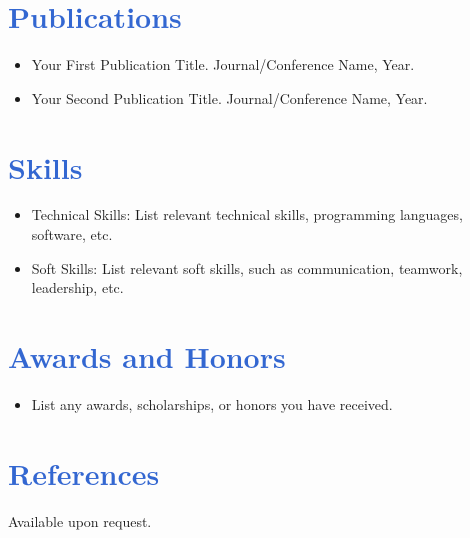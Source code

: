 \documentclass[11pt,a4paper]{article}
\begin{document}
\section*{\textcolor{highlight}{Publications}}
\begin{itemize}
    \item Your First Publication Title. Journal/Conference Name, Year.
    \item Your Second Publication Title. Journal/Conference Name, Year.
\end{itemize}

\section*{\textcolor{highlight}{Skills}}
\begin{itemize}
    \item Technical Skills: List relevant technical skills, programming languages, software, etc.
    \item Soft Skills: List relevant soft skills, such as communication, teamwork, leadership, etc.
\end{itemize}

\section*{\textcolor{highlight}{Awards and Honors}}
\begin{itemize}
    \item List any awards, scholarships, or honors you have received.
\end{itemize}

\section*{\textcolor{highlight}{References}}
Available upon request.
\end{document}
